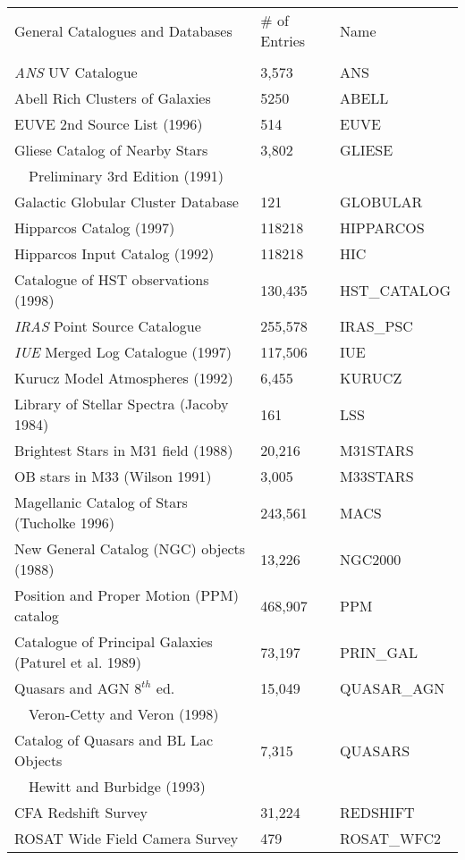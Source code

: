 \begin{tabular}{lll}
 General Catalogues and Databases & \# of Entries & Name       \\
         &          &        \\

 {\em ANS} UV Catalogue & 3,573 & ANS                    \\
 Abell Rich Clusters of Galaxies & 5250 & ABELL  \\
 EUVE 2nd Source List (1996) & 514 & EUVE \\
 Gliese Catalog of Nearby Stars & 3,802 & GLIESE \\
 ~~Preliminary 3rd Edition (1991) & & \\
 Galactic Globular Cluster Database & 121 & GLOBULAR \\
 Hipparcos Catalog (1997) & 118218 & HIPPARCOS \\
 Hipparcos Input Catalog (1992) & 118218 & HIC \\
 Catalogue of HST observations (1998) & 130,435 & HST\_CATALOG \\
 {\em IRAS} Point Source Catalogue & 255,578 & IRAS\_PSC \\
 {\em IUE} Merged Log Catalogue (1997) & 117,506 & IUE           \\ 
 Kurucz Model Atmospheres (1992) & 6,455 & KURUCZ \\
 Library of Stellar Spectra (Jacoby 1984) & 161 & LSS \\
 Brightest Stars in M31 field (1988) & 20,216 & M31STARS \\
 OB stars in M33 (Wilson 1991) & 3,005 & M33STARS \\
 Magellanic Catalog of Stars (Tucholke 1996) & 243,561 & MACS \\
 New General Catalog (NGC) objects (1988) & 13,226 & NGC2000 \\
 Position and Proper Motion (PPM) catalog & 468,907 & PPM \\
 Catalogue of Principal Galaxies (Paturel et al. 1989) & 73,197 & PRIN\_GAL \\
 Quasars and AGN $8^{th}$ ed. & 15,049 & QUASAR\_AGN \\
 ~~Veron-Cetty and Veron (1998) & & \\
 Catalog of Quasars and BL Lac Objects & 7,315 & QUASARS \\
 ~~Hewitt and Burbidge (1993) \\
 CFA Redshift Survey & 31,224 & REDSHIFT            \\
 ROSAT Wide Field Camera Survey & 479 & ROSAT\_WFC2 \\

\end{tabular}
